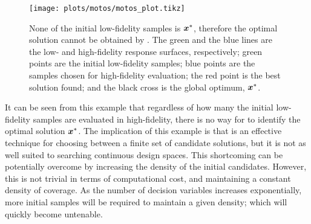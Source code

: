 \begin{figure}[h!]
  \centering
  \texttt{[image: plots/motos/motos\_plot.tikz]} 
  \caption{None of the initial low-fidelity samples is $\boldsymbol{x}^*$, therefore the optimal solution cannot be obtained by \motos{}. The green and the blue lines are the low- and high-fidelity response surfaces, respectively; green points are the initial low-fidelity samples; blue points are the samples chosen for high-fidelity evaluation; the red point is the best solution found; and the black cross is the global optimum, $\boldsymbol{x}^*$.} 
    \label{fig:motos-example}
\end{figure}
It can be seen from this example that regardless of how many the initial low-fidelity samples are evaluated in high-fidelity, there is no way for \motos{} to identify the optimal solution $\boldsymbol{x}^*$. The implication of this example is that \motos{} is an effective technique for choosing between a finite set of candidate solutions, but it is not as well suited to searching continuous design spaces. This shortcoming can be potentially overcome by increasing the density of the initial candidates. However, this is not trivial in terms of computational cost, and maintaining a constant density of coverage. As the number of decision variables increases exponentially, more initial samples will be required to maintain a given density; which will quickly become untenable.
